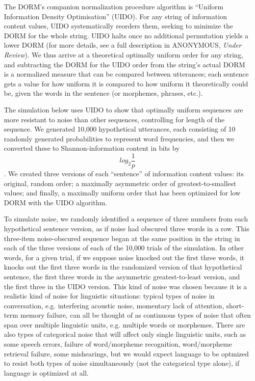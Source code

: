 \documentclass[12pt]{article}
\begin{document}
The DORM's companion normalization procedure algorithm is ``Uniform Information Density Optimisation'' (UIDO). For any string of information content values, UIDO systematically reorders them, seeking to minimize the DORM for the whole string. UIDO halts once no additional permutation yields a lower DORM (for more details, see a full description in ANONYMOUS, \textsl{Under Review}). We thus arrive at a theoretical optimally uniform order for any string, and subtracting the DORM for the UIDO order from the string's actual DORM is a normalized measure that can be compared between utterances; each sentence gets a value for how uniform it is compared to how uniform it theoretically could be, given the words in the sentence (or morphemes, phrases, etc.).

The simulation below uses UIDO to show that optimally uniform sequences are more resistant to noise than other sequences, controlling for length of the sequence. We generated 10,000 hypothetical utterances, each consisting of 10 randomly generated probabilities to represent word frequencies, and then we converted these to Shannon-information content in bits by $$log_2 \frac{1}{p}$$. We created three versions of each ``sentence'' of information content values: its original, random order; a maximally asymmetric order of greatest-to-smallest values; and finally, a maximally uniform order that has been optimized for low DORM with the UIDO algorithm.

To simulate noise, we randomly identified a sequence of three numbers from each hypothetical sentence version, as if noise had obscured three words in a row. This three-item noise-obscured sequence began at the same position in the string in each of the three versions of each of the 10,000 trials of the simulation. In other words, for a given trial, if we suppose noise knocked out the first three words, it knocks out the first three words in the randomized version of that hypothetical sentence, the first three words in the asymmetric greatest-to-least version, and the first three in the UIDO version. This kind of noise was chosen because it is a realistic kind of noise for linguistic situations: typical types of noise in conversation, e.g. interfering acoustic noise, momentary lack of attention, short-term memory failure, can all be thought of as continuous types of noise that often span over multiple linguistic units, e.g. multiple words or morphemes. There are also types of categorical noise that will affect only single linguistic units, such as some speech errors, failure of word/morpheme recognition, word/morpheme retrieval failure, some mishearings, but we would expect language to be optmized to resist both types of noise simultaneously (not the categorical type alone), if language is optimized at all.
\end{document}
